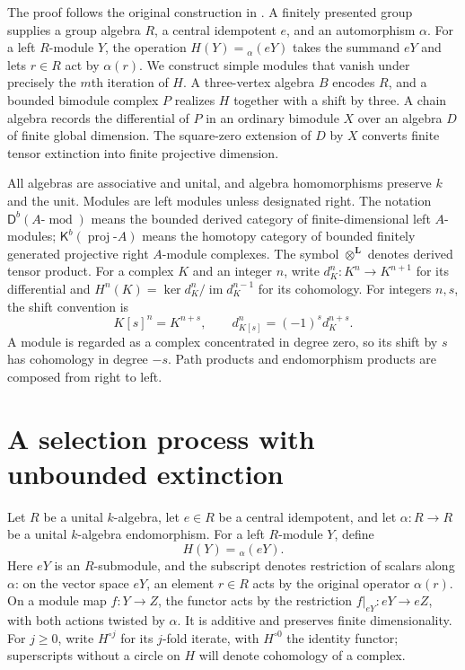 \documentclass[11pt]{article}
\numberwithin{equation}{section}
\theoremstyle{definition}
\theoremstyle{remark}
\newcommand{\D}{\mathsf D}
\newcommand{\K}{\mathsf K}
\newcommand{\otL}{\otimes^{\mathbf L}}
\DeclareMathOperator{\proj}{proj}
\DeclareMathOperator{\modu}{mod}
\begin{document}
The proof follows the original construction in \cite{OpenAI198}.
A finitely presented group supplies a group algebra $R$, a central
idempotent $e$, and an automorphism $\alpha$. For a left $R$-module
$Y$, the operation $H(Y)={}_{\alpha}(eY)$ takes the summand $eY$ and lets
$r\in R$ act by $\alpha(r)$. We construct simple modules that vanish
under precisely the $m$th iteration of $H$.
A three-vertex algebra $B$ encodes $R$, and a bounded bimodule complex
$P$ realizes $H$ together with a shift by three.
A chain algebra records the differential of $P$ in an ordinary
bimodule $X$ over an algebra $D$ of finite global dimension.
The square-zero extension of $D$ by $X$ converts finite tensor
extinction into finite projective dimension.

All algebras are associative and unital, and algebra homomorphisms
preserve $k$ and the unit. Modules are left modules unless designated
right. The notation $\D^b(A\text{-}\modu)$ means the bounded derived
category of finite-dimensional left $A$-modules; $\K^b(\proj\text{-}A)$
means the homotopy category of bounded finitely generated projective
right $A$-module complexes. The symbol $\otL$ denotes derived tensor
product. For a complex $K$ and an integer $n$, write
$d_K^n:K^n\to K^{n+1}$ for its
differential and $H^n(K)=\ker d_K^n/\operatorname{im}d_K^{n-1}$
for its cohomology. For integers $n,s$, the shift convention is
\[
K[s]^n=K^{n+s},\qquad d_{K[s]}^n=(-1)^s d_K^{n+s}.
\]
A module is regarded as a complex concentrated in degree zero, so
its shift by $s$ has cohomology in degree $-s$.
Path products and endomorphism products are composed from right to left.

\section{A selection process with unbounded extinction}
\label{sec:selection}

Let $R$ be a unital $k$-algebra, let $e\in R$ be a central idempotent,
and let $\alpha:R\to R$ be a unital $k$-algebra endomorphism.  For a left
$R$-module $Y$, define
\begin{equation}
  H(Y)={}_{\alpha}(eY).
  \label{eq:selection-functor}
\end{equation}
Here $eY$ is an $R$-submodule, and the subscript denotes restriction of
scalars along $\alpha$: on the vector space $eY$, an element $r\in R$
acts by the original operator $\alpha(r)$. On a module map $f:Y\to Z$,
the functor acts by the restriction $f|_{eY}:eY\to eZ$, with both actions
twisted by $\alpha$. It is additive and preserves finite dimensionality.
For $j\ge0$, write $H^{\circ j}$ for its $j$-fold iterate, with
$H^{\circ 0}$ the identity functor; superscripts without a circle on
$H$ will denote cohomology of a complex.
\end{document}
